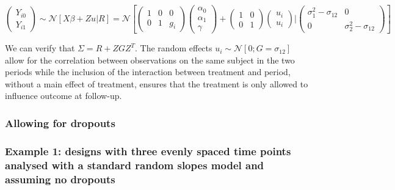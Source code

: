 \documentclass[final, paper=letter,5p,times,twocolumn]{elsarticle}
\theoremstyle{definition}
\begin{document}
\begin{strip}
\begin{equation*}
  \left(
  \begin{array}{c}
    Y_{i0} \\
    Y_{i1}
  \end{array}
  \right) \sim \mathcal{N} \left[ X\beta + Zu| R \right]= \mathcal{N} \left[
    \left(
    \begin{array}{ccc}
      1 & 0 & 0 \\
      0 & 1 & g_{i}
    \end{array}
    \right)
    \left(
    \begin{array}{c}
      \alpha_{0} \\
      \alpha_{1} \\
      \gamma
    \end{array}
    \right) + \left(
    \begin{array}{cc}
      1 & 0 \\
      0 & 1
    \end{array}
    \right)\left(
    \begin{array}{c}
      u_{i}  \\
      u_{i} 
    \end{array}
    \right)|
    \left(
    \begin{array}{cc}
      \sigma_{1}^{2}-\sigma_{12} & 0 \\
      0                        & \sigma_{2}^{2}-\sigma_{12}
    \end{array}
    \right)
  \right]
\end{equation*}
\end{strip}

We can verify that $\Sigma = R + ZGZ^{T}$. The random effects $u_{i} \sim \mathcal{N}[0; G = \sigma_{12}]$ allow for the correlation between observations on the same subject in the two periods while the inclusion of the interaction between treatment and period, without a main effect of treatment, ensures that the treatment is only allowed to influence outcome at follow-up.

\subsubsection{Allowing for dropouts}

\subsubsection{Example 1: designs with three evenly spaced time points analysed with a standard random slopes model and assuming no dropouts}
\end{document}
